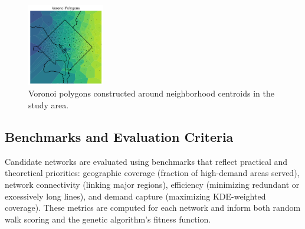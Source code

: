 \documentclass[sigconf,nonacm]{acmart}
\begin{document}
\begin{figure}[ht]
    \centering
    \includegraphics[width=0.3\textwidth]{./img/voronoi.png}
    \caption{Voronoi polygons constructed around neighborhood centroids in the study area.}
    \label{fig:voronoi}
\end{figure}


\subsection{Benchmarks and Evaluation Criteria}
Candidate networks are evaluated using benchmarks that reflect practical and theoretical priorities: geographic coverage (fraction of high-demand areas served), network connectivity (linking major regions), efficiency (minimizing redundant or excessively long lines), and demand capture (maximizing KDE-weighted coverage). These metrics are computed for each network and inform both random walk scoring and the genetic algorithm's fitness function.
\end{document}
